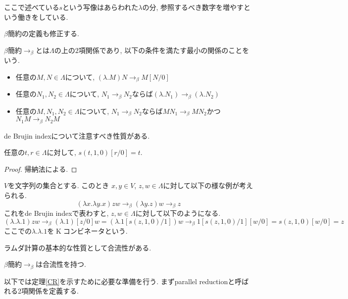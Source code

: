 \documentclass[12pt, titlepage]{ltjsarticle}
\DeclareMathOperator{\K}{K}
\begin{document}
ここで述べている$s$という写像はあらわれた$\lambda$の分, 参照するべき数字を増やすという働きをしている.

$\beta$簡約の定義も修正する.

\begin{defn}
 $\beta$簡約$\rightarrow_{\beta}$とは$\Lambda$の上の$2$項関係であり, 以下の条件を満たす最小の関係のことをいう.
 \begin{itemize}
  \item 任意の$M, N \in \Lambda$について, $(\lambda. M) N \rightarrow_\beta M[N/0]$
  \item 任意の$N_1, N_2 \in \Lambda$について, $N_1 \rightarrow_\beta N_2$ならば$(\lambda. N_1) \rightarrow_\beta (\lambda. N_2)$
  \item 任意の$M, N_1, N_2 \in \Lambda$について, $N_1 \rightarrow_\beta N_2$ならば$M N_1 \rightarrow_\beta M N_2$かつ$N_1 M \rightarrow_\beta N_2 M$
 \end{itemize}
\end{defn}

de Brujin indexについて注意すべき性質がある.

\begin{lem}
 任意の$t, r \in \Lambda$に対して, $s (t, 1, 0)[r/0] = t$.
\end{lem}
\begin{proof}
 帰納法による.
\end{proof}

\begin{ex}[$\K$ コンビネータ]
 $V$を文字列の集合とする. このとき $x, y \in V$, $z, w \in \Lambda$に対して以下の様な例が考えられる.
 \[
 (\lambda x. \lambda y. x) z w \rightarrow_{\beta} (\lambda y. z) w \rightarrow_{\beta} z
 \]
 これをde Brujin indexで表わすと, $z, w \in \Lambda$に対して以下のようになる.
 \[
 (\lambda. \lambda. 1) z w \rightarrow_{\beta} (\lambda. 1)[z/0] w = (\lambda. 1[s (z, 1, 0)/1]) w \rightarrow_{\beta} 1[s (z, 1, 0)/1][w/0] = s (z, 1, 0)[w/0] = z
 \]
ここでの$\lambda. \lambda. 1$を$\K$コンビネータという.
\end{ex}

ラムダ計算の基本的な性質として合流性がある.

\begin{thm}\label{CR}
 $\beta$簡約$\rightarrow_{\beta}$は合流性を持つ.
\end{thm}

以下では定理\ref{CR}を示すために必要な準備を行う. まずparallel reductionと呼ばれる2項関係を定義する.
\end{document}
